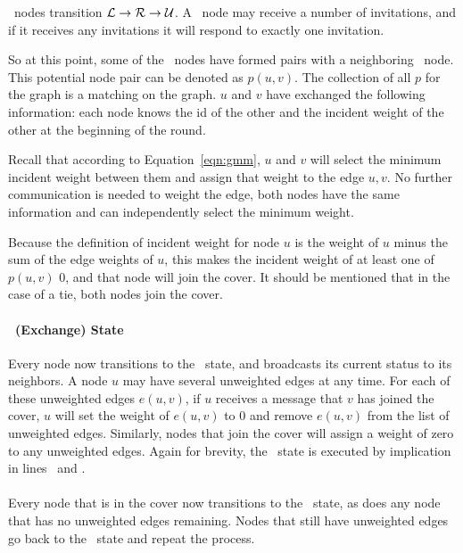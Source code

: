 \cLd\ nodes transition ${\mathcal L} \rightarrow {\mathcal R} \rightarrow {\mathcal U}$. A \cLd\ node may receive a number of invitations, and if it receives any invitations it will respond to exactly one invitation.

So at this point, some of the \cId\ nodes have formed pairs with a neighboring \cLd\ node. This potential node pair can be denoted as $p(u,v)$. The collection of all $p$ for the graph is a matching on the graph. $u$ and $v$ have exchanged the following information: each node knows the id of the other and the incident weight of the other at the beginning of the round.

Recall that according to Equation~\eqref{eqn:gmm}, $u$ and $v$ will select the minimum incident weight between them and assign that weight to the edge $u,v$. No further communication is needed to weight the edge, both nodes have the same information and can independently select the minimum weight. 

Because the definition of incident weight for node $u$ is the weight of $u$ minus the sum of the edge weights of $u$, this makes the incident weight of at least one of $p(u,v)$ 0, and that node will join the cover. It should be mentioned that in the case of a tie, both nodes join the cover.

\paragraph{\cEd\ (Exchange) State}
Every node now transitions to the \cEd\ state, and broadcasts its current status to its neighbors. A node $u$ may have several unweighted edges at any time. For each of these unweighted edges $e(u,v)$, if $u$ receives a message that $v$ has joined the cover, $u$ will set the weight of $e(u,v)$ to 0 and remove $e(u,v)$ from the list of unweighted edges. Similarly, nodes that join the cover will assign a weight of zero to any unweighted edges. Again for brevity, the \cEd\ state is executed by implication in lines~ and .

\paragraph{}Every node that is in the cover now transitions to the \cDd\ state, as does any node that has no unweighted edges remaining. Nodes that still have unweighted edges go back to the \cCd\ state and repeat the process. 

